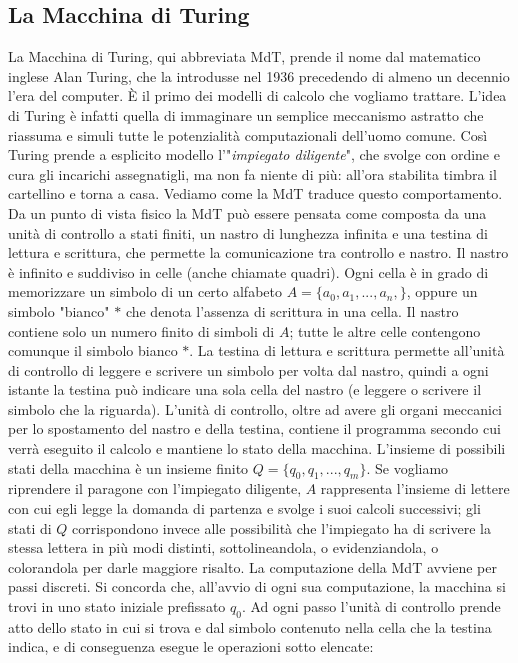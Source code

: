 \subsection{La Macchina di Turing}

La Macchina di Turing, qui abbreviata MdT, prende il nome dal matematico
inglese Alan Turing, che la introdusse nel 1936 precedendo di almeno un decennio
l'era del computer.
È il primo dei modelli di calcolo che vogliamo trattare.
L'idea di Turing è infatti
quella di immaginare un semplice meccanismo astratto che riassuma e
simuli tutte le potenzialità computazionali dell'uomo comune.
Così Turing prende a esplicito
modello l'"\textit{impiegato diligente}", che svolge con ordine e cura gli
incarichi assegnatigli, ma non fa niente di più:
all'ora stabilita timbra il cartellino e torna a casa.
Vediamo come la MdT traduce questo comportamento.
Da un punto di vista fisico la MdT può essere pensata come composta da una unità
di controllo a stati finiti, un nastro di lunghezza infinita e una testina di
lettura e scrittura, che permette la comunicazione tra controllo e nastro.
Il nastro è infinito e suddiviso in celle (anche chiamate quadri).
Ogni cella è in
grado di memorizzare un simbolo di un certo alfabeto $A = \{a_0, a_1, ..., a_n,\}$,
oppure un simbolo "bianco" $*$ che denota l'assenza di scrittura in una cella.
Il nastro contiene solo un numero finito di simboli di $A$;
tutte le altre celle contengono comunque il simbolo bianco $*$.
La testina di lettura e scrittura permette all'unità di
controllo di leggere e scrivere un simbolo per volta dal nastro,
quindi a ogni istante la testina può indicare una sola cella del nastro
(e leggere o scrivere il simbolo che la riguarda).
L'unità di controllo, oltre ad avere gli organi meccanici per lo
spostamento del nastro e della testina, contiene il programma secondo cui verrà
eseguito il calcolo e mantiene lo stato della macchina.
L'insieme di possibili stati della macchina è un insieme finito
$Q = \{q_0, q_1, ..., q_m\}$.
Se vogliamo riprendere il paragone con l'impiegato diligente, $A$
rappresenta l'insieme di lettere con cui egli legge la domanda di partenza e
svolge i suoi calcoli successivi;
gli stati di $Q$ corrispondono invece alle possibilità che l'impiegato ha
di scrivere la stessa lettera in più modi distinti, sottolineandola, o
evidenziandola, o colorandola per darle maggiore risalto.
La computazione della MdT avviene per passi discreti. Si concorda che, all'avvio
di ogni sua computazione, la macchina si trovi in uno stato iniziale prefissato
$q_0$.
Ad ogni passo l'unità di controllo prende atto dello stato in cui si trova e dal
simbolo contenuto nella cella che la testina indica, e di conseguenza esegue le
operazioni sotto elencate:

